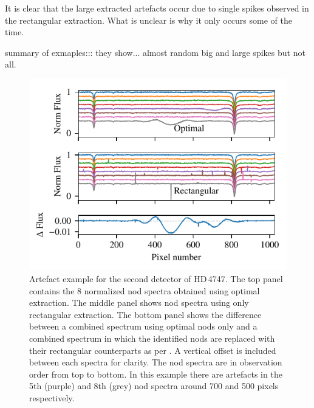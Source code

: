 It is clear that the large extracted artefacts occur due to single spikes observed in the rectangular extraction. What is unclear is why it only occurs some of the time.

summary of exmaples::: they show...  almost random big and large spikes but not all.



 \begin{figure}
     \centering
     \includegraphics[width=0.9\linewidth]{figures/appendix/bp_plots/extraction_comparision_HD4747-1_chip_2}
     \caption{Artefact example for the second detector of {HD\,4747}.  The top panel contains the 8 normalized nod spectra obtained using optimal extraction. The middle panel shows nod spectra using only rectangular extraction. The bottom panel shows the difference between a combined spectrum using optimal nods only and a combined spectrum in which the identified nods are replaced with their rectangular counterparts as per . A vertical offset is included between each spectra for clarity. The nod spectra are in observation order from top to bottom. In this example there are artefacts in the 5th (purple) and 8th (grey) nod spectra around 700 and 500 pixels respectively.}
     \label{fig:artefact_example1}
 \end{figure}
